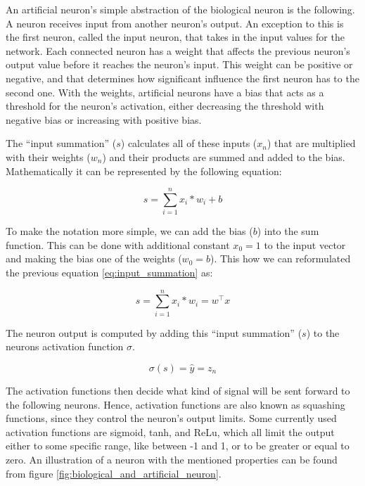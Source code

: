 An artificial neuron's simple abstraction of the biological neuron is the following. A neuron receives input from another neuron's output. An exception to this is the first neuron, called the input neuron, that takes in the input values for the network. Each connected neuron has a weight that affects the previous neuron's output value before it reaches the neuron's input. This weight can be positive or negative, and that determines how significant influence the first neuron has to the second one. With the weights, artificial neurons have a bias that acts as a threshold for the neuron's activation, either decreasing the threshold with negative bias or increasing with positive bias.

The “input summation” ($s$) calculates all of these inputs ($x_n$) that are multiplied with their weights ($w_n$) and their products are summed and added to the bias. Mathematically it can be represented by the following equation:

\begin{equation}
    s = \sum_{i=1}^{n} x_i*w_i +b
    \label{eq:input_summation}
\end{equation}

To make the notation more simple, we can add the bias ($b$) into the sum function. This can be done with additional constant $x_0=1$ to the input vector and making the bias one of the weights ($w_0=b$). This how we can reformulated the previous equation \ref{eq:input_summation} as:

\begin{equation}
    s = \sum_{i=1}^{n} x_i*w_i = w^\top x
\end{equation}

The neuron output is computed by adding this “input summation” ($s$) to the neurons activation function $\sigma$.

\begin{equation}
    \sigma(s) = \widehat{y} = z_n
\end{equation}

The activation functions then decide what kind of signal will be sent forward to the following neurons. Hence, activation functions are also known as squashing functions, since they control the neuron's output limits. Some currently used activation functions are sigmoid, tanh, and ReLu, which all limit the output either to some specific range, like between -1 and 1, or to be greater or equal to zero. An illustration of a neuron with the mentioned properties can be found from figure \ref{fig:biological_and_artificial_neuron}.


